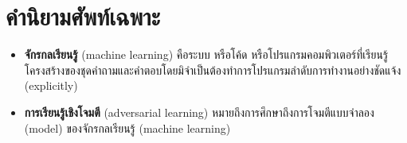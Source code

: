 \section{คํานิยามศัพท์เฉพาะ}
\begin{itemize}
    \item \textbf{จักรกลเรียนรู้} (machine learning) คือระบบ หรือโค้ด หรือโปรแกรมคอมพิวเตอร์ที่เรียนรู้โครงสร้างของชุดคำถามและคำตอบโดยมิจำเป็นต้องทำการโปรแกรมลำดับการทำงานอย่างชัดแจ้ง (explicitly) 
    \item \textbf{การเรียนรู้เชิงโจมตี} (adversarial learning) หมายถึงการศึกษาถึงการโจมตีแบบจำลอง (model) ของจักรกลเรียนรู้ (machine learning)
\end{itemize}